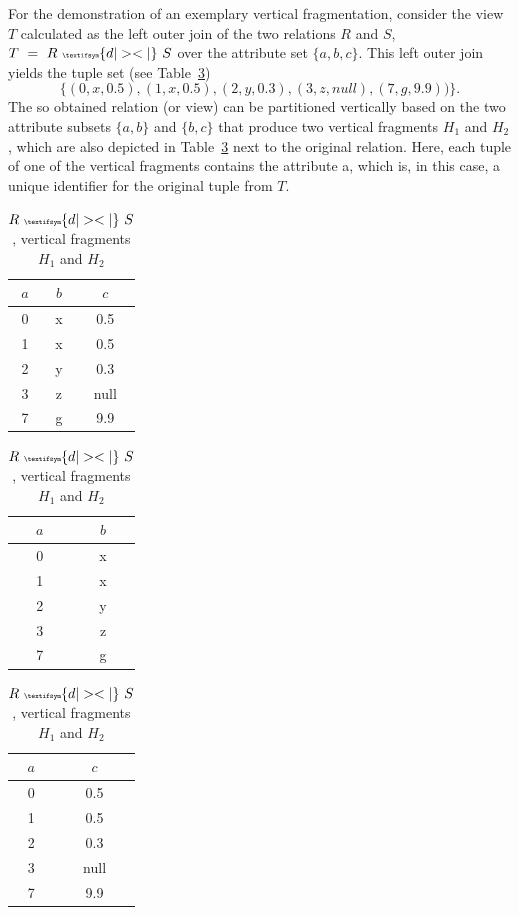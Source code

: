 \begin{exmp}
For the demonstration of an exemplary vertical fragmentation, consider the view $T$ calculated as the left outer join of the two relations $R$ and $S$, 
$T~=~R~{\tiny \textifsym{d|><|}}~S$ over the attribute set $\{a,b,c\}$. 
This left outer join yields the tuple set (see Table~\ref{tab:join_vert_frag})
\[
\{(0,x,0.5), (1,x,0.5), (2,y,0.3), (3,z,null), (7,g,9.9))\}.
\]
The so obtained relation (or view) can be partitioned vertically based on the two attribute subsets $\{a,b\}$ and $\{b,c\}$ that produce two vertical
fragments $H_1$ and $H_2$, which are also depicted in Table~\ref{tab:join_vert_frag} next to the original relation. Here, each tuple of one of the 
vertical fragments contains the attribute a, which is, in this case, a unique identifier for the original tuple from $T$.

\begin{table}[h]
    \centering
    \begin{tabular}{c|c|c}
        $a$ & $b$ & $c$ \\
        \hline
        0 & x & 0.5 \\
        1 & x & 0.5 \\
        2 & y & 0.3 \\
        3 & z & null \\
        7 & g & 9.9 \\
    \end{tabular}
    \hspace{20pt}
    \begin{tabular}{c|c}
        $a$ & $b$ \\
        \hline
        0 & x \\
        1 & x \\
        2 & y \\
        3 & z \\
        7 & g \\
    \end{tabular}
    \hspace{5pt}
    \begin{tabular}{c|c}
        $a$ & $c$ \\
        \hline
        0 & 0.5 \\
        1 & 0.5 \\
        2 & 0.3 \\
        3 & null \\
        7 & 9.9 \\
    \end{tabular}
    \caption{$R~{\tiny \textifsym{d|><|}}~S$, vertical fragments $H_1$ and $H_2$}
    \label{tab:join_vert_frag}
\end{table}

\end{exmp}




